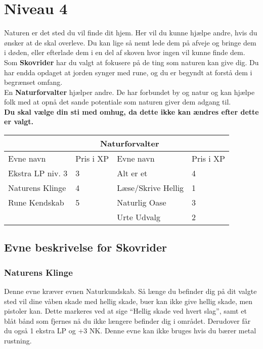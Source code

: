 \chapter*{Niveau 4}
Naturen er det sted du vil finde dit hjem. Her vil du kunne hjælpe andre, hvis du ønsker at de skal overleve. Du kan lige så nemt lede dem på afveje og bringe dem i døden, eller efterlade dem i en del af skoven hvor ingen vil kunne finde dem.\\
Som \textbf{Skovrider} har du valgt at fokusere på de ting som naturen kan give dig. Du har endda opdaget at jorden synger med rune, og du er begyndt at forstå dem i begrænset omfang.\\ 
En \textbf{Naturforvalter} hjælper andre. De har forbundet by og natur og kan hjælpe folk med at opnå det sande potentiale som naturen giver dem adgang til.\\

\textbf{Du skal vælge din sti med omhug, da dette ikke kan ændres efter dette er valgt.}\\

\begin{tabular}{|p{}|p{}|p{}|p{}|}
\hline
\rowcolor{cerulean!80}
 \multicolumn{2}{|c|}{ Skovrider } & \multicolumn{2}{|c|}{ Naturforvalter }\\
\hline
\rowcolor{cerulean!40}
    Evne navn & Pris i XP & Evne navn & Pris i XP\\ \hline
    Ekstra LP niv. 3 & 3 & Alt er et & 4 \\\hline
    Naturens Klinge & 4 & Læse/Skrive Hellig & 1  \\\hline
    Rune Kendskab & 5 & Naturlig Oase & 3\\\hline
    &&Urte Udvalg &2 \\\hline

\end{tabular}

\section*{Evne beskrivelse for Skovrider}



\subsection*{Naturens Klinge}
Denne evne kræver evnen Naturkundskab. Så længe du befinder dig på dit valgte sted vil dine våben skade med hellig skade, buer kan ikke give hellig skade, men pistoler kan. Dette markeres ved at sige “Hellig skade ved hvert slag”, samt et blåt bånd som fjernes nå du ikke længere befinder dig i området. Derudover får du også 1 ekstra LP og +3 NK. Denne evne kan ikke bruges hvis du bærer metal rustning.

